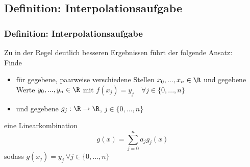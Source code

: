 \subsection{Definition: Interpolationsaufgabe}
%
\begin{frame}\frametitle{Definition: Interpolationsaufgabe}
Zu in der Regel deutlich besseren Ergebnissen führt der folgende Ansatz:\\\vfill
Finde 
\begin{itemize}
\item für gegebene, paarweise verschiedene Stellen $x_0,...,x_n \in \R$ und gegebene Werte $y_0,...,y_n \in \R$ mit $f(x_j)=y_j \quad \forall j \in \{0,...,n\}$
\item und gegebene  $g_j: \R \to \R$, $j \in \{0,...,n\}$
\end{itemize}
eine Linearkombination
$$
g(x)=\sum_{j=0}^n a_j g_j(x)
$$
sodass $g(x_j)=y_j \ \forall j \in \{0,...,n\}$
\end{frame}
%
